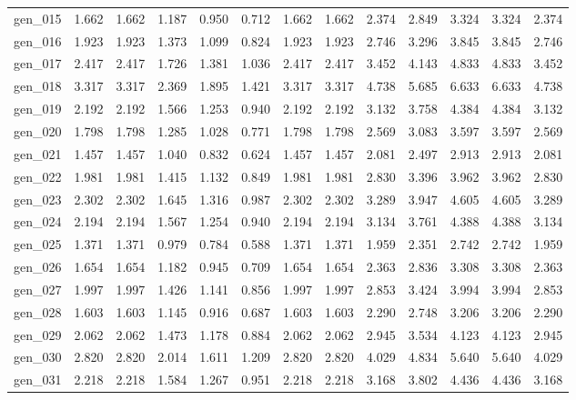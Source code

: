 \begin{tabular}{lrrrrrrrrrrrr}
gen\_015 &  1.662 &  1.662 &  1.187 &  0.950 &  0.712 &  1.662 &  1.662 &  2.374 &  2.849 &  3.324 &  3.324 &  2.374 \\
gen\_016 &  1.923 &  1.923 &  1.373 &  1.099 &  0.824 &  1.923 &  1.923 &  2.746 &  3.296 &  3.845 &  3.845 &  2.746 \\
gen\_017 &  2.417 &  2.417 &  1.726 &  1.381 &  1.036 &  2.417 &  2.417 &  3.452 &  4.143 &  4.833 &  4.833 &  3.452 \\
gen\_018 &  3.317 &  3.317 &  2.369 &  1.895 &  1.421 &  3.317 &  3.317 &  4.738 &  5.685 &  6.633 &  6.633 &  4.738 \\
gen\_019 &  2.192 &  2.192 &  1.566 &  1.253 &  0.940 &  2.192 &  2.192 &  3.132 &  3.758 &  4.384 &  4.384 &  3.132 \\
gen\_020 &  1.798 &  1.798 &  1.285 &  1.028 &  0.771 &  1.798 &  1.798 &  2.569 &  3.083 &  3.597 &  3.597 &  2.569 \\
gen\_021 &  1.457 &  1.457 &  1.040 &  0.832 &  0.624 &  1.457 &  1.457 &  2.081 &  2.497 &  2.913 &  2.913 &  2.081 \\
gen\_022 &  1.981 &  1.981 &  1.415 &  1.132 &  0.849 &  1.981 &  1.981 &  2.830 &  3.396 &  3.962 &  3.962 &  2.830 \\
gen\_023 &  2.302 &  2.302 &  1.645 &  1.316 &  0.987 &  2.302 &  2.302 &  3.289 &  3.947 &  4.605 &  4.605 &  3.289 \\
gen\_024 &  2.194 &  2.194 &  1.567 &  1.254 &  0.940 &  2.194 &  2.194 &  3.134 &  3.761 &  4.388 &  4.388 &  3.134 \\
gen\_025 &  1.371 &  1.371 &  0.979 &  0.784 &  0.588 &  1.371 &  1.371 &  1.959 &  2.351 &  2.742 &  2.742 &  1.959 \\
gen\_026 &  1.654 &  1.654 &  1.182 &  0.945 &  0.709 &  1.654 &  1.654 &  2.363 &  2.836 &  3.308 &  3.308 &  2.363 \\
gen\_027 &  1.997 &  1.997 &  1.426 &  1.141 &  0.856 &  1.997 &  1.997 &  2.853 &  3.424 &  3.994 &  3.994 &  2.853 \\
gen\_028 &  1.603 &  1.603 &  1.145 &  0.916 &  0.687 &  1.603 &  1.603 &  2.290 &  2.748 &  3.206 &  3.206 &  2.290 \\
gen\_029 &  2.062 &  2.062 &  1.473 &  1.178 &  0.884 &  2.062 &  2.062 &  2.945 &  3.534 &  4.123 &  4.123 &  2.945 \\
gen\_030 &  2.820 &  2.820 &  2.014 &  1.611 &  1.209 &  2.820 &  2.820 &  4.029 &  4.834 &  5.640 &  5.640 &  4.029 \\
gen\_031 &  2.218 &  2.218 &  1.584 &  1.267 &  0.951 &  2.218 &  2.218 &  3.168 &  3.802 &  4.436 &  4.436 &  3.168 \\

\end{tabular}
